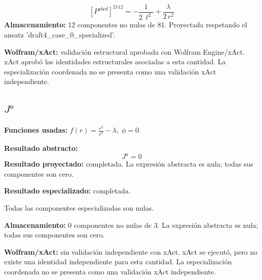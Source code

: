 \documentclass[11pt]{article}
\begin{document}
\begin{dmath*}[breakdepth={5}]
\left[P^{abcd}\right]^{2112} = -\frac{1}{2\,{\ell}^{2}} + \frac{\lambda}{2\,{r}^{2}}
\end{dmath*}
\textbf{Almacenamiento:} 12 componentes no nulas de 81. Proyectada respetando el ansatz 'draft4\_case\_0\_specialized'.\par
\textbf{Wolfram/xAct:} validación estructural aprobada con Wolfram Engine/xAct. xAct aprobó las identidades estructurales asociadas a esta cantidad. La especialización coordenada no se presenta como una validación xAct independiente.\par\medskip
{}
\subsection*{$ J^a $}
\textbf{Funciones usadas:} $ f\!\left(r\right) = \frac{{r}^{2}}{{\ell}^{2}} - \lambda,\;\phi=0 $.\par
\textbf{Resultado abstracto:}
\begin{dmath*}[breakdepth={5}]
J^a = 0
\end{dmath*}
\textbf{Resultado proyectado:} completada. La expresión abstracta es nula; todas sus componentes son cero.\par
\textbf{Resultado especializado:} completada.\par
Todas las componentes especializadas son nulas.\par
\textbf{Almacenamiento:} 0 componentes no nulas de 3. La expresión abstracta es nula; todas sus componentes son cero.\par
\textbf{Wolfram/xAct:} sin validación independiente con xAct. xAct se ejecutó, pero no existe una identidad independiente para esta cantidad. La especialización coordenada no se presenta como una validación xAct independiente.\par\medskip
{}
\end{document}
